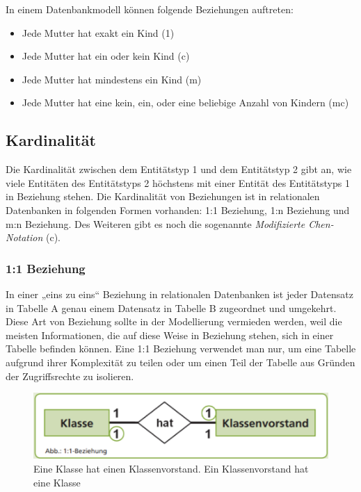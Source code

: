  In einem Datenbankmodell können folgende Beziehungen auftreten:

 \begin{itemize}
     \item Jede Mutter hat exakt ein Kind (1)
     \item Jede Mutter hat ein oder kein Kind (c)
     \item Jede Mutter hat mindestens ein Kind (m)
     \item Jede Mutter hat eine kein, ein, oder eine beliebige Anzahl von Kindern (mc)
 \end{itemize}

 \subsection{Kardinalität}

 Die Kardinalität zwischen dem Entitätstyp 1 und dem Entitätstyp 2 gibt an, wie viele Entitäten des Entitätstyps 2 höchstens mit einer Entität des Entitätstyps 1 in Beziehung stehen. Die Kardinalität von Beziehungen ist in relationalen Datenbanken in folgenden Formen vorhanden: 
 1:1 Beziehung, 1:n Beziehung und m:n Beziehung. Des Weiteren gibt es noch die sogenannte \emph{Modifizierte Chen-Notation} (c).
 
 \subsubsection{1:1 Beziehung}

 In einer „eins zu eins“ Beziehung in relationalen Datenbanken ist jeder Datensatz in Tabelle A genau einem Datensatz in Tabelle B zugeordnet und umgekehrt. Diese Art von Beziehung sollte in der Modellierung vermieden werden, weil die meisten Informationen, die auf diese Weise in Beziehung stehen, sich in einer Tabelle befinden können. Eine 1:1 Beziehung verwendet man nur, um eine Tabelle aufgrund ihrer Komplexität zu teilen oder um einen Teil der Tabelle aus Gründen der Zugriffsrechte zu isolieren.

 \begin{figure}[h]
    \centering
    \includegraphics[width=.8\textwidth]{Content/images/modellierung/11.png}
    \caption{Eine Klasse hat einen Klassenvorstand. Ein Klassenvorstand hat eine Klasse}
    \label{fig:modellierung:11}
 \end{figure}

